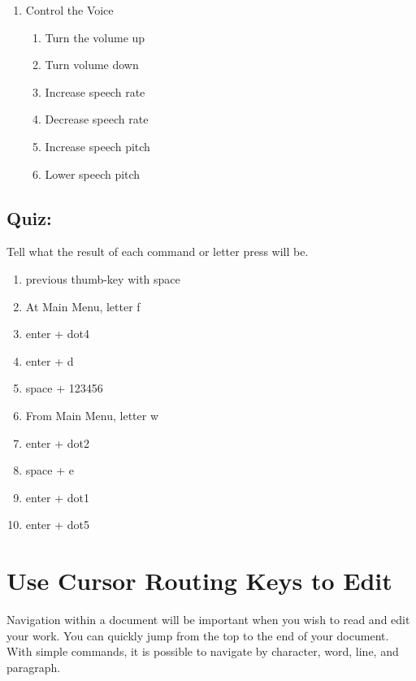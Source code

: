 \documentclass[10pt,letterpaper,twoside]{report}
\begin{document}
\begin{enumerate}
	\item Control the Voice
	      \begin{enumerate}
		      \item Turn the volume up 
		      \item Turn volume down 
		      \item Increase speech rate 
		      \item Decrease speech rate 
		      \item Increase speech pitch 
		      \item Lower speech pitch 
	      \end{enumerate}
\end{enumerate}
\subsection{Quiz:}
Tell what the result of each command or letter press will be.
\begin{enumerate}
	\item previous thumb-key with space
	\item At Main Menu, letter f
	\item enter + dot4
	\item enter + d
	\item space + 123456
	\item From Main Menu, letter w
	\item enter + dot2
	\item space + e
	\item enter + dot1
	\item enter + dot5
\end{enumerate}

\clearpage
\section*{Use Cursor Routing Keys to Edit}
Navigation within a document will be important when you wish to read and edit your work. You can quickly jump from the top to the end of your document. With simple commands, it is possible to navigate by character, word, line, and paragraph. 
\end{document}
